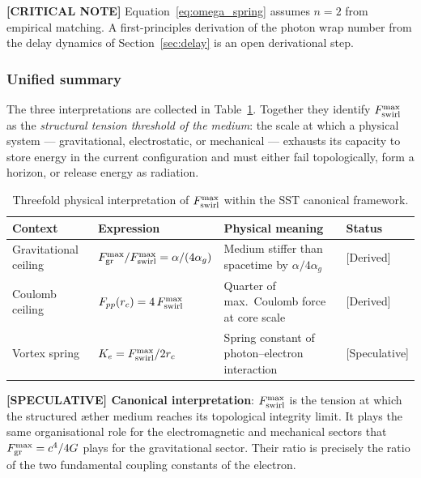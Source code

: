 \documentclass[11pt]{article}
\theoremstyle{definition}
\theoremstyle{plain}
\theoremstyle{remark}
\newcommand{\rc}{{r_c}}
\begin{document}
        \textbf{[CRITICAL NOTE]} Equation~\eqref{eq:omega_spring} assumes $n=2$ from empirical matching. A first-principles derivation of the photon wrap number from the delay dynamics of Section~\ref{sec:delay} is an open derivational step.

        \subsubsection{Unified summary}

        The three interpretations are collected in Table~\ref{tab:Fmax_triple}. Together they identify $F_{\rm swirl}^{\max}$ as the \emph{structural tension threshold of the medium}: the scale at which a physical system --- gravitational, electrostatic, or mechanical --- exhausts its capacity to store energy in the current configuration and must either fail topologically, form a horizon, or release energy as radiation.

        \begin{table}[h]
        \centering
        \caption{Threefold physical interpretation of $F_{\rm swirl}^{\max}$ within the SST canonical framework.}
        \label{tab:Fmax_triple}
        \begin{tabular}{p{3.2cm}p{5.0cm}p{4.8cm}l}
        \hline
        \textbf{Context} & \textbf{Expression} & \textbf{Physical meaning} & \textbf{Status} \\
        \hline
        Gravitational ceiling &
          $F_{\rm gr}^{\max}/F_{\rm swirl}^{\max} = \alpha/(4\alpha_g)$ &
          Medium stiffer than spacetime by $\alpha/4\alpha_g$ &
          {[Derived]} \\[6pt]
        Coulomb ceiling &
          $F_{pp}(\rc) = 4\,F_{\rm swirl}^{\max}$ &
          Quarter of max.\ Coulomb force at core scale &
          {[Derived]} \\[6pt]
        Vortex spring &
          $K_e = F_{\rm swirl}^{\max}/2\rc$ &
          Spring constant of photon--electron interaction &
          {[Speculative]} \\
        \hline
        \end{tabular}
        \end{table}

        \textbf{[SPECULATIVE] Canonical interpretation}: $F_{\rm swirl}^{\max}$ is the tension at which the structured \ae ther medium reaches its topological integrity limit. It plays the same organisational role for the electromagnetic and mechanical sectors that $F_{\rm gr}^{\max} = c^4/4G$ plays for the gravitational sector. Their ratio is precisely the ratio of the two fundamental coupling constants of the electron.
\end{document}
